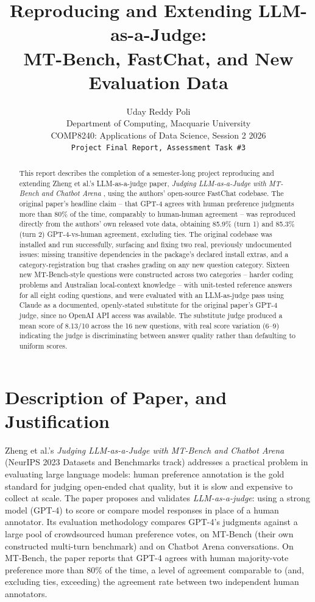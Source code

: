 \documentclass[11pt,twocolumn]{article}
\title{\textbf{Reproducing and Extending LLM-as-a-Judge:\\ MT-Bench, FastChat, and New Evaluation Data}}
\author{Uday Reddy Poli \\ Department of Computing, Macquarie University \\ COMP8240: Applications of Data Science, Session 2 2026 \\ \texttt{Project Final Report, Assessment Task \#3}}
\date{}
\begin{document}
\maketitle

\begin{abstract}
This report describes the completion of a semester-long project reproducing and extending
Zheng et al.'s LLM-as-a-judge paper, \emph{Judging LLM-as-a-Judge with MT-Bench
and Chatbot Arena} \cite{zheng2023judging}, using the authors' open-source FastChat codebase. The
original paper's headline claim -- that GPT-4 agrees with human preference judgments more than 80\%
of the time, comparably to human-human agreement -- was reproduced directly from the authors'
own released vote data, obtaining 85.9\% (turn 1) and 85.3\% (turn 2) GPT-4-vs-human agreement,
excluding ties. The original codebase was installed and run successfully, surfacing and fixing two
real, previously undocumented issues: missing transitive dependencies in the package's declared
install extras, and a category-registration bug that crashes grading on any new question category.
Sixteen new MT-Bench-style questions were constructed across two categories -- harder coding
problems and Australian local-context knowledge -- with unit-tested reference answers for all eight
coding questions, and were evaluated with an LLM-as-judge pass using Claude as a documented,
openly-stated substitute for the original paper's GPT-4 judge, since no OpenAI API access was
available. The substitute judge produced a mean score of 8.13/10 across the 16 new questions, with
real score variation (6--9) indicating the judge is discriminating between answer quality rather
than defaulting to uniform scores.
\end{abstract}

\section{Description of Paper, and Justification}

Zheng et al.'s \emph{Judging LLM-as-a-Judge with MT-Bench and Chatbot Arena}
\cite{zheng2023judging} (NeurIPS 2023 Datasets and Benchmarks track) addresses a practical problem
in evaluating large language models: human preference annotation is the gold standard for judging
open-ended chat quality, but it is slow and expensive to collect at scale. The paper proposes and
validates \emph{LLM-as-a-judge}: using a strong model (GPT-4) to score or compare model responses
in place of a human annotator. Its evaluation methodology compares GPT-4's judgments against a
large pool of crowdsourced human preference votes, on MT-Bench (their own constructed
multi-turn benchmark) and on Chatbot Arena conversations. On MT-Bench, the paper reports that GPT-4
agrees with human majority-vote preference more than 80\% of the time, a level of agreement
comparable to (and, excluding ties, exceeding) the agreement rate between two independent human
annotators.
\end{document}
